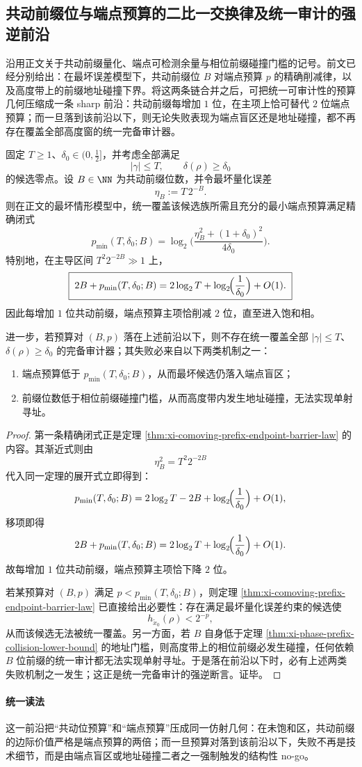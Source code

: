 \subsection{共动前缀位与端点预算的二比一交换律及统一审计的强逆前沿}\label{subsec:conclusion-comoving-prefix-endpoint-budget-strong-frontier}
沿用正文关于共动前缀量化、端点可检测余量与相位前缀碰撞门槛的记号。前文已经分别给出：在最坏误差模型下，共动前缀位 \(B\) 对端点预算 \(p\) 的精确削减律，以及高度带上的前缀地址碰撞下界。将这两条链合并之后，可把统一可审计性的预算几何压缩成一条 sharp 前沿：共动前缀每增加 \(1\) 位，在主项上恰可替代 \(2\) 位端点预算；而一旦落到该前沿以下，则无论失败表现为端点盲区还是地址碰撞，都不再存在覆盖全部高度窗的统一完备审计器。

\begin{theorem}[二比一预算交换与统一审计的强逆前沿]\label{thm:conclusion-comoving-prefix-endpoint-twoforone-strong-frontier}
固定 \(T\ge 1\)、\(\delta_0\in(0,\tfrac12]\)，并考虑全部满足
\[
|\gamma|\le T,
\qquad
\delta(\rho)\ge \delta_0
\]
的候选零点。设 \(B\in\NN\) 为共动前缀位数，并令最坏量化误差
\[
\eta_B:=T\,2^{-B}.
\]
则在正文的最坏情形模型中，统一覆盖该候选族所需且充分的最小端点预算满足精确闭式
\[
\boxed{\;
p_{\min}(T,\delta_0;B)
=
\log_2\!\Biggl(
\frac{\eta_B^2+(1+\delta_0)^2}{4\delta_0}
\Biggr).\;}
\]
特别地，在主导区间 \(T^2 2^{-2B}\gg 1\) 上，
\[
\boxed{\;
2B+p_{\min}(T,\delta_0;B)
=
2\log_2 T+\log_2\!\Bigl(\frac1{\delta_0}\Bigr)+O(1).\;}
\]
因此每增加 \(1\) 位共动前缀，端点预算主项恰削减 \(2\) 位，直至进入饱和相。

进一步，若预算对 \((B,p)\) 落在上述前沿以下，则不存在统一覆盖全部 \(|\gamma|\le T\)、\(\delta(\rho)\ge \delta_0\) 的完备审计器；其失败必来自以下两类机制之一：
\begin{enumerate}
  \item 端点预算低于 \(p_{\min}(T,\delta_0;B)\)，从而最坏候选仍落入端点盲区；
  \item 前缀位数低于相位前缀碰撞门槛，从而高度带内发生地址碰撞，无法实现单射寻址。
\end{enumerate}
\end{theorem}
\begin{proof}
第一条精确闭式正是定理 \ref{thm:xi-comoving-prefix-endpoint-barrier-law} 的内容。其渐近式则由
\[
\eta_B^2=T^2 2^{-2B}
\]
代入同一定理的展开式立即得到：
\[
p_{\min}(T,\delta_0;B)
=
2\log_2T-2B+\log_2\!\Bigl(\frac1{\delta_0}\Bigr)+O(1),
\]
移项即得
\[
2B+p_{\min}(T,\delta_0;B)
=
2\log_2T+\log_2\!\Bigl(\frac1{\delta_0}\Bigr)+O(1).
\]
故每增加 \(1\) 位共动前缀，端点预算主项恰下降 \(2\) 位。

若某预算对 \((B,p)\) 满足 \(p<p_{\min}(T,\delta_0;B)\)，则定理 \ref{thm:xi-comoving-prefix-endpoint-barrier-law} 已直接给出必要性：存在满足最坏量化误差约束的候选使
\[
h_{\tilde x_0}(\rho)<2^{-p},
\]
从而该候选无法被统一覆盖。另一方面，若 \(B\) 自身低于定理 \ref{thm:xi-phase-prefix-collision-lower-bound} 的地址门槛，则高度带上的相位前缀必发生碰撞，任何依赖 \(B\) 位前缀的统一审计都无法实现单射寻址。于是落在前沿以下时，必有上述两类失败机制之一发生；这正是统一完备审计的强逆断言。证毕。
\end{proof}

\paragraph{统一读法}
这一前沿把“共动位预算”和“端点预算”压成同一仿射几何：在未饱和区，共动前缀的边际价值严格是端点预算的两倍；而一旦预算对落到该前沿以下，失败不再是技术细节，而是由端点盲区或地址碰撞二者之一强制触发的结构性 no-go。

\endinput
